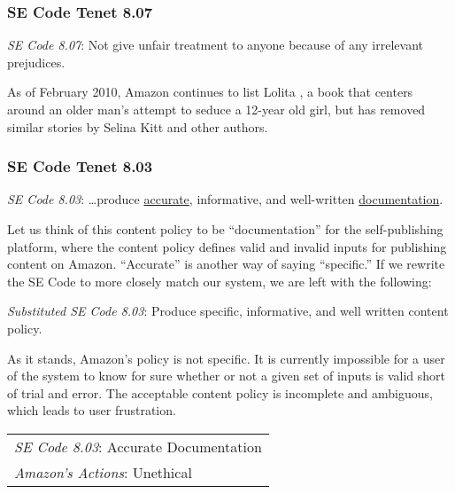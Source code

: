 \documentclass[11pt]{article}
\begin{document}
\begin{multicols}{2}
\subsubsection{SE Code Tenet 8.07}

\emph{SE Code 8.07}: Not give unfair treatment to anyone because of any irrelevant prejudices.

As of February 2010, Amazon continues to list Lolita \cite{AmazonLolitaDTPListing}, a book that centers around an older man's attempt to seduce a 12-year old girl, but has removed similar stories by Selina Kitt and other authors. \cite{KittSelfPubRevolution} 


\subsubsection{SE Code Tenet 8.03}

\emph{SE Code 8.03}: \ldots produce \underline{accurate}, informative, and well-written \underline{documentation}. 



Let us think of this content policy to be ``documentation'' for the self-publishing platform, where the content policy defines valid and invalid inputs for publishing content on Amazon.  ``Accurate'' is another way of saying ``specific.''  If we rewrite the SE Code to more closely match our system, we are left with the following:

\emph{Substituted SE Code 8.03}: Produce specific, informative, and well written content policy.

As it stands, Amazon's policy is not specific.  It is currently impossible for a user of the system to know for sure whether or not a given set of inputs is valid short of trial and error.  The acceptable content policy is incomplete and ambiguous, which leads to user frustration. \\

\begin{tabular}{| l |}
\hline
\emph{SE Code 8.03}: Accurate Documentation \\
\emph{Amazon's Actions}: Unethical \\
\hline
\end{tabular}
\\



\end{multicols}
\end{document}
